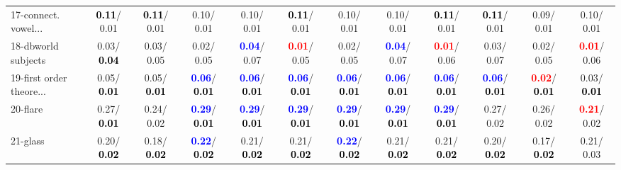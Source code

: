 \begin{table}[h]
\begin{center}
{\begin{tabular}{lc|c|c|c|c|c|c|c|c|c|c}
17-connect. vowel... & \textcolor{black}{\textbf{  0.11}}/  0.01 & \textcolor{black}{\textbf{  0.11}}/  0.01 &   0.10/  0.01 &   0.10/  0.01 & \textcolor{black}{\textbf{  0.11}}/  0.01 &   0.10/  0.01 &   0.10/  0.01 & \textcolor{black}{\textbf{  0.11}}/  0.01 & \textcolor{black}{\textbf{  0.11}}/  0.01 &   0.09/  0.01 &   0.10/  0.01 \\
18-dbworld subjects &   0.03/\textcolor{black}{\textbf{  0.04}} &   0.03/  0.05 &   0.02/  0.05 & \textcolor{blue}{\textbf{  0.04}}/  0.07 & \textcolor{red}{\textbf{  0.01}}/  0.05 &   0.02/  0.05 & \textcolor{blue}{\textbf{  0.04}}/  0.07 & \textcolor{red}{\textbf{  0.01}}/  0.06 &   0.03/  0.07 &   0.02/  0.05 & \textcolor{red}{\textbf{  0.01}}/  0.06 \\
19-first order theore... &   0.05/\textcolor{black}{\textbf{  0.01}} &   0.05/\textcolor{black}{\textbf{  0.01}} & \textcolor{blue}{\textbf{  0.06}}/\textcolor{black}{\textbf{  0.01}} & \textcolor{blue}{\textbf{  0.06}}/\textcolor{black}{\textbf{  0.01}} & \textcolor{blue}{\textbf{  0.06}}/\textcolor{black}{\textbf{  0.01}} & \textcolor{blue}{\textbf{  0.06}}/\textcolor{black}{\textbf{  0.01}} & \textcolor{blue}{\textbf{  0.06}}/\textcolor{black}{\textbf{  0.01}} & \textcolor{blue}{\textbf{  0.06}}/\textcolor{black}{\textbf{  0.01}} & \textcolor{blue}{\textbf{  0.06}}/\textcolor{black}{\textbf{  0.01}} & \textcolor{red}{\textbf{  0.02}}/\textcolor{black}{\textbf{  0.01}} &   0.03/\textcolor{black}{\textbf{  0.01}} \\
20-flare &   0.27/\textcolor{black}{\textbf{  0.01}} &   0.24/  0.02 & \textcolor{blue}{\textbf{  0.29}}/\textcolor{black}{\textbf{  0.01}} & \textcolor{blue}{\textbf{  0.29}}/\textcolor{black}{\textbf{  0.01}} & \textcolor{blue}{\textbf{  0.29}}/\textcolor{black}{\textbf{  0.01}} & \textcolor{blue}{\textbf{  0.29}}/\textcolor{black}{\textbf{  0.01}} & \textcolor{blue}{\textbf{  0.29}}/\textcolor{black}{\textbf{  0.01}} & \textcolor{blue}{\textbf{  0.29}}/\textcolor{black}{\textbf{  0.01}} &   0.27/  0.02 &   0.26/  0.02 & \textcolor{red}{\textbf{  0.21}}/  0.02 \\
21-glass &   0.20/\textcolor{black}{\textbf{  0.02}} &   0.18/\textcolor{black}{\textbf{  0.02}} & \textcolor{blue}{\textbf{  0.22}}/\textcolor{black}{\textbf{  0.02}} &   0.21/\textcolor{black}{\textbf{  0.02}} &   0.21/\textcolor{black}{\textbf{  0.02}} & \textcolor{blue}{\textbf{  0.22}}/\textcolor{black}{\textbf{  0.02}} &   0.21/\textcolor{black}{\textbf{  0.02}} &   0.21/\textcolor{black}{\textbf{  0.02}} &   0.20/\textcolor{black}{\textbf{  0.02}} &   0.17/\textcolor{black}{\textbf{  0.02}} &   0.21/  0.03 \\ \hline

\end{tabular}}
\end{center}
\end{table}
